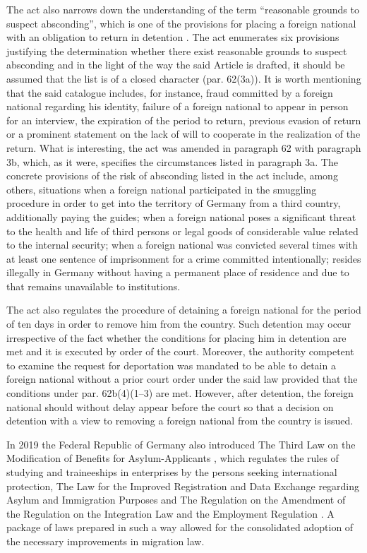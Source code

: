 \documentclass[10pt,a4paper]{article}
\begin{document}
\begin{multicols}{2}
The act also narrows down the understanding of the term ``reasonable grounds to suspect absconding'', which is one of the provisions for placing a foreign national with an obligation to return in detention \citep{R61}. The act enumerates six provisions justifying the determination whether there exist reasonable grounds to suspect absconding and in the light of the way the said Article is drafted, it should be assumed that the list is of a closed character (par. 62(3a)). It is worth mentioning that the said catalogue includes, for instance, fraud committed by a foreign national regarding his identity, failure of a foreign national to appear in person for an interview, the expiration of the period to return, previous evasion of return or a prominent statement on the lack of will to cooperate in the realization of the return. What is interesting, the act was amended in paragraph 62 with paragraph 3b, which, as it were, specifies the circumstances listed in paragraph 3a. The concrete provisions of the risk of absconding listed in the act include, among others, situations when a foreign national participated in the smuggling procedure in order to get into the territory of Germany from a third country, additionally paying the guides; when a foreign national poses a significant threat to the health and life of third persons or legal goods of considerable value related to the internal security; when a foreign national was convicted several times with at least one sentence of imprisonment for a crime committed intentionally; resides illegally in Germany without having a permanent place of residence and due to that remains unavailable to institutions.

The act also regulates the procedure of detaining a foreign national for the period of ten days in order to remove him from the country. Such detention may occur irrespective of the fact whether the conditions for placing him in detention are met and it is executed by order of the court. Moreover, the authority competent to examine the request for deportation was mandated to be able to detain a foreign national without a prior court order under the said law provided that the conditions under par. 62b(4)(1--3) \citep{R62} are met. However, after detention, the foreign national should without delay appear before the court so that a decision on detention with a view to removing a foreign national from the country is issued.

In 2019 the Federal Republic of Germany also introduced The Third Law on the Modification of Benefits for Asylum-Applicants \citep{R63}, which regulates the rules of studying and traineeships in enterprises by the persons seeking international protection, The Law for the Improved Registration and Data Exchange regarding Asylum and Immigration Purposes \citep{R64} and The Regulation on the Amendment of the Regulation on the Integration Law and the Employment Regulation \citep{R65,R66,R67}. A package of laws prepared in such a way allowed for the consolidated adoption of the necessary improvements in migration law.


\end{multicols}
\end{document}
